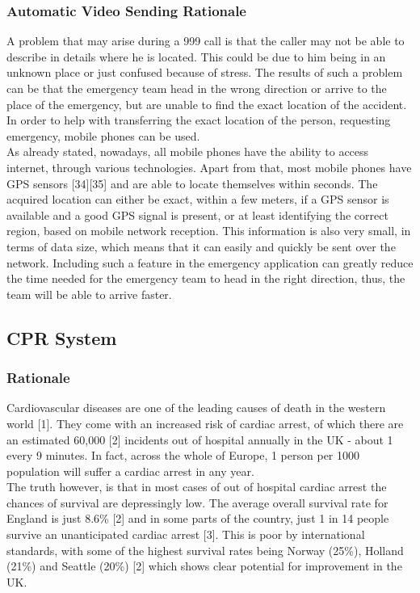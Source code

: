 \documentclass[]{article}
\begin{document}
	\subsubsection{Automatic Video Sending Rationale}
	A problem that may arise during a 999 call is that the caller may not be able to describe in details where he is located. This could be due to him being in an unknown place or just confused because of stress. The results of such a problem can be that the emergency team head in the wrong direction or arrive to the place of the emergency, but are unable to find the exact location of the accident. In order to help with transferring the exact location of the person, requesting emergency, mobile phones can be used.\\

As already stated, nowadays, all mobile phones have the ability to access internet, through various technologies. Apart from that, most mobile phones have GPS sensors [34][35] and are able to locate themselves within seconds. The acquired location can either be exact, within a few meters, if a GPS sensor is available and a good GPS signal is present, or at least identifying the correct region, based on mobile network reception. This information is also very small, in terms of data size, which means that it can easily and quickly be sent over the network. Including such a feature in the emergency application can greatly reduce the time needed for the emergency team to head in the right direction, thus, the team will be able to arrive faster.\\
    	
    \pagebreak	
    \subsection{CPR System}
    	\subsubsection{Rationale}
    	Cardiovascular diseases are one of the leading causes of death in the western world [1]. They come with an increased risk of cardiac arrest, of which there are an estimated 60,000 [2] incidents out of hospital annually in the UK - about 1 every 9 minutes. In fact, across the whole of Europe, 1 person per 1000 population will suffer a cardiac arrest in any year.\\
    	
The truth however, is that in most cases of out of hospital cardiac arrest the chances of survival are depressingly low. The average overall survival rate for England is just 8.6\% [2] and in some parts of the country, just 1 in 14 people survive an unanticipated cardiac arrest [3]. This is poor by international standards, with some of the highest survival rates being Norway (25\%), Holland (21\%) and Seattle (20\%) [2] which shows clear potential for improvement in the UK.\\
\end{document}
